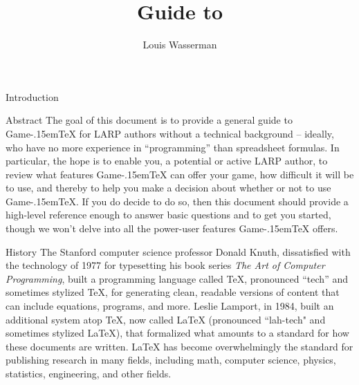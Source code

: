 \documentclass[11pt]{article}
\title{Guide to \gametex{}}
\author{Louis Wasserman}
\def\gametex{\mbox{Game\kern-.15em\TeX}}
\begin{document}
\maketitle{}
\setcounter{tocdepth}{2}
\tableofcontents
\begin{section}{Introduction}
\begin{subsection}{Abstract}
The goal of this document is to provide a general guide to \gametex{} for LARP authors without a technical background -- ideally, who have no more experience in ``programming'' than spreadsheet formulas.  In particular, the hope is to enable you, a potential or active LARP author, to review what features \gametex{} can offer your game, how difficult it will be to use, and thereby to help you make a decision about whether or not to use \gametex{}.  If you do decide to do so, then this document should provide a high-level reference enough to answer basic questions and to get you started, though we won't delve into all the power-user features \gametex{} offers.

\end{subsection}
\begin{subsection}{History}
The Stanford computer science professor Donald Knuth, dissatisfied with the technology of 1977 for typesetting his book series \textit{The Art of Computer Programming}, built a programming language called TeX,
pronounced ``tech'' and sometimes stylized \TeX{}, for generating clean, readable versions of content that can include equations, programs, and more. 
Leslie Lamport, in 1984, built an additional system atop \TeX{}, now called LaTeX (pronounced ``lah-tech" and sometimes stylized \LaTeX{}), that formalized what amounts to a standard for how these documents are written.  LaTeX has become overwhelmingly the standard for publishing research in many fields, including math, computer science, physics, statistics, engineering, and other fields.


\end{subsection}
\end{section}
\end{document}
